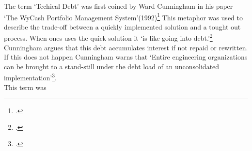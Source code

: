 The term `Techical Debt' was first coined by Ward Cunningham in his paper `The WyCash Portfolio Management System'(1992)\footcite{cunninghamWyCashPortfolioManagement1992} This metaphor was used to describe the trade-off between a quickly implemented solution and a tought out process. 
When ones uses the quick solution it `is like going into debt.'\footcite[2]{cunninghamWyCashPortfolioManagement1992} Cunningham argues that this debt accumulates interest if not repaid or rewritten. 
If this does not happen Cunningham warns that `Entire engineering organizations can be brought to a stand-still under the debt load of an unconsolidated implementation'\footcite[2]{cunninghamWyCashPortfolioManagement1992}.\\

This term was 

